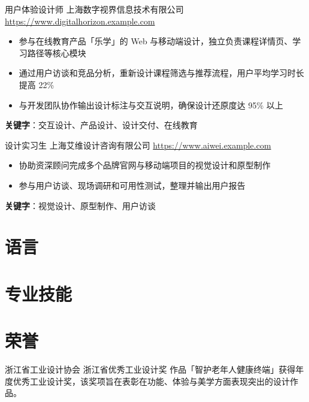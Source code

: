 \documentclass[a4paper, serif, 10pt]{moderncv}
\begin{document}
        {用户体验设计师}
        {上海数字视界信息技术有限公司}
        {\url{https://www.digitalhorizon.example.com}}
        {}
        {\begin{itemize}
\item 参与在线教育产品「乐学」的 Web 与移动端设计，独立负责课程详情页、学习路径等核心模块
\item 通过用户访谈和竞品分析，重新设计课程筛选与推荐流程，用户平均学习时长提高 22\%
\item 与开发团队协作输出设计标注与交互说明，确保设计还原度达 95\% 以上
\end{itemize}
\textbf{关键字}：交互设计、产品设计、设计交付、在线教育}

        {设计实习生}
        {上海艾维设计咨询有限公司}
        {\url{https://www.aiwei.example.com}}
        {}
        {\begin{itemize}
\item 协助资深顾问完成多个品牌官网与移动端项目的视觉设计和原型制作
\item 参与用户访谈、现场调研和可用性测试，整理并输出用户报告
\end{itemize}
\textbf{关键字}：视觉设计、原型制作、用户访谈}
\section{语言}

\section{专业技能}

\section{荣誉}

        {浙江省工业设计协会}
        {浙江省优秀工业设计奖}
        {}
        {}
        {作品「智护老年人健康终端」获得年度优秀工业设计奖，该奖项旨在表彰在功能、体验与美学方面表现突出的设计作品。}
\end{document}
